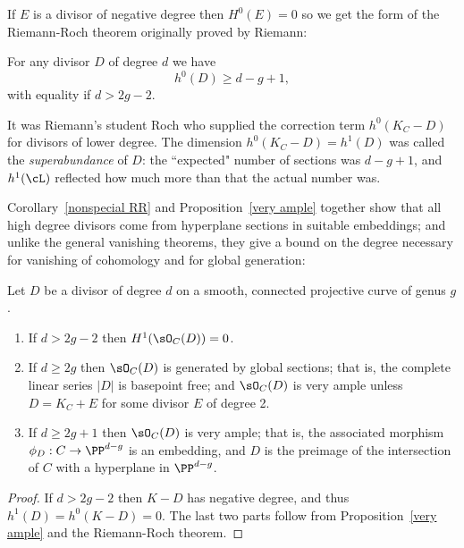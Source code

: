 If $E$ is a divisor of negative degree then $H^0(E) = 0$ so we get the form of the Riemann-Roch theorem
originally proved by Riemann:

\begin{corollary}\label{nonspecial RR}
For any divisor $D$ of degree $d$ we have
$$
h^0(D) \geq d - g + 1,
$$
with equality if $d > 2g-2$.
\end{corollary}
It was Riemann's student Roch  who supplied the correction term $h^0(K_C - D)$ for divisors of lower degree.
The dimension $h^0(K_C-D) = h^1(D)$ was called the \emph{superabundance} of $D$: the ``expected" number of sections was $d-g+1$, and $h^1(\cL)$ reflected how much more than that the actual number was.

Corollary~\ref{nonspecial RR} and Proposition~\ref{very ample} together show that all high degree divisors come from hyperplane sections in 
suitable embeddings; and unlike the general vanishing theorems, they give a bound on the degree necessary for vanishing
of cohomology and for
global generation:

\begin{corollary}\label{degree 2g+1 embedding}
Let $D$ be a divisor of degree $d$ on a smooth, connected projective curve of genus $g$.
\begin{enumerate}
 \item If $d>2g-2$ then $H^1(\sO_C(D)) = 0$.
 \item If $d \geq 2g$ then $\sO_C(D)$ is generated by global sections; that is, the complete linear series $|D|$ is basepoint free; and $\sO_C(D)$ is very ample unless $D = K_{C}+E$ for some divisor $E$ of degree 2.
 \item If $d \geq 2g+1$ then $\sO_C(D)$ is very ample; that is, the associated morphism $\phi_D : C \to \PP^{d-g}$ is an embedding, and
$D$ is the preimage of the intersection of $C$ with a hyperplane in $ \PP^{d-g}$.
\end{enumerate}
\end{corollary}

\begin{proof}
If $d>2g-2$ then $K-D$ has negative degree, and thus $h^1(D) = h^0(K-D) = 0.$ The last two parts follow
from Proposition~\ref{very ample} and the Riemann-Roch theorem.
\end{proof}

